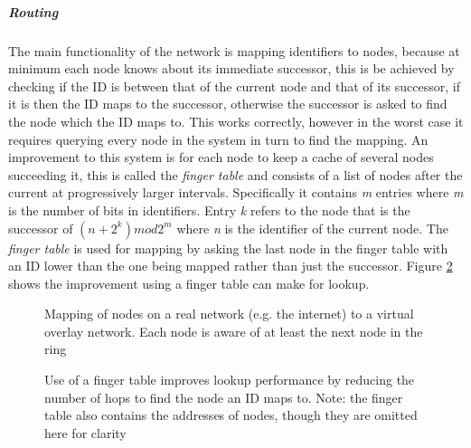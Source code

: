 \documentclass{article}
\begin{document}
\subparagraph{Routing} The main functionality of the network is mapping identifiers to nodes, because at minimum each node knows about its immediate successor, this is be achieved by checking if the ID is between that of the current node and that of its successor, if it is then the ID maps to the successor, otherwise the successor is asked to find the node which the ID maps to. 
This works correctly, however in the worst case it requires querying every node in the system in turn to find the mapping. 
An improvement to this system is for each node to keep a cache of several nodes succeeding it, this is called the \textit{finger table} and consists of a list of nodes after the current at progressively larger intervals.
Specifically it contains \textit{m} entries where \textit{m} is the number of bits in identifiers. Entry \textit{k} refers to the node that is the successor of $(n + 2^k) mod 2^m$ where \textit{n} is the identifier of the current node.
The \textit{finger table} is used for mapping by asking the last node in the finger table with an ID lower than the one being mapped rather than just the successor.
Figure \ref{fig:fingersRbttr} shows the improvement using a finger table can make for lookup.

\begin{figure}
\centering
\def\svgwidth{\columnwidth}

\caption{Mapping of nodes on a real network (e.g. the internet) to a virtual overlay network. Each node is aware of at least the next node in the ring}
\label{fig:rtovmap}
\end{figure}


\begin{figure}
\centering
\def\svgwidth{0.95\columnwidth}

\caption[caption]{Use of a finger table improves lookup performance by reducing the number of hops to find the node an ID maps to.
Note: the finger table also contains the addresses of nodes, though they are omitted here for clarity}
\label{fig:fingersRbttr}
\end{figure}
\end{document}
